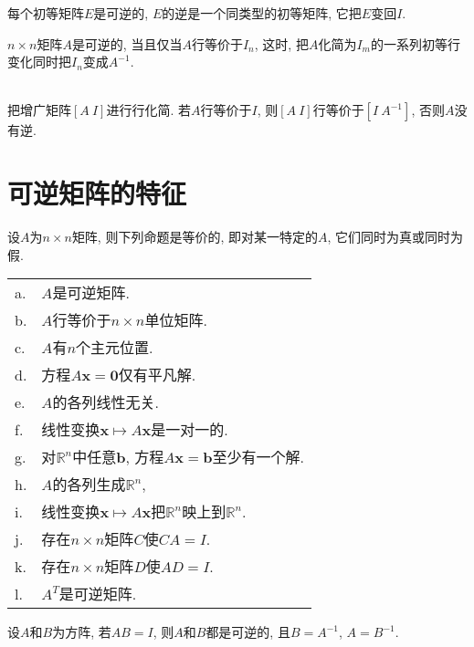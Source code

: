 \begin{law}
每个初等矩阵$E$是可逆的, $E$的逆是一个同类型的初等矩阵, 它把$E$变回$I$.
\end{law}\vspace{4ex}

\begin{TheoremOne}
$n\times n$矩阵$A$是可逆的, 当且仅当$A$行等价于$I_n$, 这时, 把$A$化简为$I_m$的一系列初等行变化同时把$I_n$变成$A^{-1}$.
\end{TheoremOne}\vspace{4ex}

\begin{law}[求$A^{-1}$的算法]\ \\
把增广矩阵$[A\ I]$进行行化简. 若$A$行等价于$I$, 则$[A\ I]$行等价于$[I\ A^{-1}]$, 否则$A$没有逆.
\end{law}\vspace{8ex}

\section{可逆矩阵的特征}
\begin{TheoremTwo}[可逆矩阵定理]
设$A$为$n\times n$矩阵, 则下列命题是等价的, 即对某一特定的$A$, 它们同时为真或同时为假.\\
\begin{tabular}{l@{\ }l}
a. & $A$是可逆矩阵.\\
b. & $A$行等价于$n\times n$单位矩阵.\\
c. & $A$有$n$个主元位置.\\
d. & 方程$A\bm{x}=\bm{0}$仅有平凡解.\\
e. & $A$的各列线性无关.\\
f. & 线性变换$\bm{x}\mapsto A\bm{x}$是一对一的.\\
g. & 对$\mathbb{R}^n$中任意$\bm{b}$, 方程$A\bm{x}=\bm{b}$至少有一个解.\\
h. & $A$的各列生成$\mathbb{R}^n$,\\
i. & 线性变换$\bm{x}\mapsto A\bm{x}$把$\mathbb{R}^n$映上到$\mathbb{R}^n$.\\
j. & 存在$n\times n$矩阵$C$使$CA=I$.\\
k. & 存在$n\times n$矩阵$D$使$AD=I$.\\
l. & $A^T$是可逆矩阵.
\end{tabular}
\end{TheoremTwo}\vspace{4ex}

\begin{law}
设$A$和$B$为方阵, 若$AB=I$, 则$A$和$B$都是可逆的, 且$B=A^{-1}$, $A=B^{-1}$.
\end{law}\vspace{4ex}

